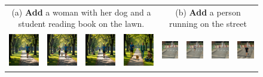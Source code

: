 \documentclass{article}
\begin{document}
\begin{figure}[h!]
\begin{tabular}{@{\hskip 1pt} p{\dimexpr\textwidth/9\relax}
                   @{\hskip 1pt} p{\dimexpr\textwidth/9\relax}
                   @{\hskip 1pt} p{\dimexpr\textwidth/9\relax}
                   @{\hskip 1pt} p{\dimexpr\textwidth/9\relax}
                   @{\hskip 5pt} p{\dimexpr\textwidth/9\relax}
                   @{\hskip 1pt} p{\dimexpr\textwidth/9\relax}
                   @{\hskip 1pt} p{\dimexpr\textwidth/9\relax}
                   @{\hskip 1pt} p{\dimexpr\textwidth/9\relax} @{}}

\multicolumn{4}{c}{\tiny (a) \textbf{Add} a woman with her dog and a student reading book on the lawn.} & 
\multicolumn{4}{c}{\tiny (b) \textbf{Add} a person running on the street}  \\
\includegraphics[width=\linewidth,  height=1.5cm]{figures/f1/1_1.png} &
\includegraphics[width=\linewidth,  height=1.5cm]{figures/f1/1_2.png} &
\includegraphics[width=\linewidth,  height=1.5cm]{figures/f1/1_3.png} &
\includegraphics[width=\linewidth,  height=1.5cm]{figures/f1/1_4.png} &
\includegraphics[width=\linewidth,  height=1.5cm]{figures/f1/4_1.png} &
\includegraphics[width=\linewidth,  height=1.5cm]{figures/f1/4_2.jpg} &
\includegraphics[width=\linewidth,  height=1.5cm]{figures/f1/4_3.jpg} &
\includegraphics[width=\linewidth,  height=1.5cm]{figures/f1/4_4.png} \\[-1pt]


\end{tabular}
\end{figure}
\end{document}
